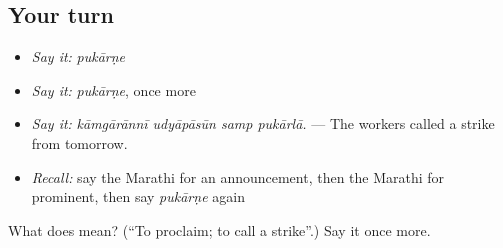 \subsection*{Your turn}
\begin{itemize}
\raggedright
  \item \emph{Say it:} \emph{pukārṇe}
  \item \emph{Say it:} \emph{pukārṇe}, once more
  \item \emph{Say it:} \emph{kāmgārānnī udyāpāsūn samp pukārlā.} — The workers called a strike from tomorrow.
  \item \emph{Recall:} say the Marathi for an announcement, then the Marathi for prominent, then say \emph{pukārṇe} again
\end{itemize}

\begin{tcolorbox}[breakable,colback=teal!4,colframe=teal!35!black,title={Before you move on}]
What does  mean? (\textquotedblleft{}To proclaim; to call a strike\textquotedblright{}.) Say it once more.
\end{tcolorbox}
